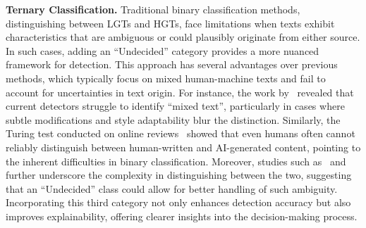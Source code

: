 \textbf{Ternary Classification.}
Traditional binary classification methods, distinguishing between LGTs and HGTs, face limitations when texts exhibit characteristics that are ambiguous or could plausibly originate from either source. In such cases, adding an ``Undecided'' category provides a more nuanced framework for detection. This approach has several advantages over previous methods, which typically focus on mixed human-machine texts and fail to account for uncertainties in text origin. For instance, the work by~\citet{lee2024llm} revealed that current detectors struggle to identify ``mixed text'', particularly in cases where subtle modifications and style adaptability blur the distinction. Similarly, the Turing test conducted on online reviews~\cite{turingtest2024} showed that even humans often cannot reliably distinguish between human-written and AI-generated content, pointing to the inherent difficulties in binary classification. Moreover, studies such as~\cite{turingtest2024} and \cite{coling2024} further underscore the complexity in distinguishing between the two, suggesting that an ``Undecided'' class could allow for better handling of such ambiguity. Incorporating this third category not only enhances detection accuracy but also improves explainability, offering clearer insights into the decision-making process.